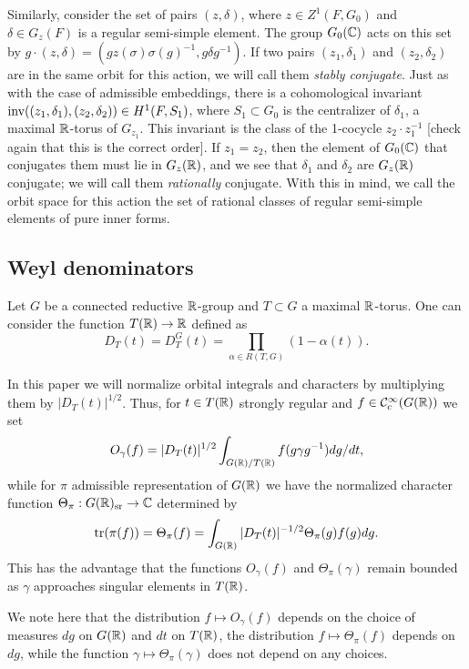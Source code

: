 \documentclass{article}
\theoremstyle{definition}
\numberwithin{equation}{section}
\renewcommand{\-}{\hyp{}}
\newcommand{\warn}[1]{{\leavevmode\color{red}[#1]}}
\begin{document}
Similarly, consider the set of pairs $(z,\delta)$, where $z \in Z^1(F,G_0)$ and $\delta \in G_z(F)$ is a regular semi-simple element. The group $G_0(\mathbb{C})$ acts on this set by $g\cdot (z,\delta)=(gz(\sigma)\sigma(g)^{-1},g\delta g^{-1})$. If two pairs $(z_1,\delta_1)$ and $(z_2,\delta_2)$ are in the same orbit for this action, we will call them \emph{stably conjugate}. Just as with the case of admissible embeddings, there is a cohomological invariant $\textrm{inv}((z_1,\delta_1),(z_2,\delta_2)) \in H^1(F,S_1)$, where $S_1 \subset G_0$ is the centralizer of $\delta_1$, a maximal $\mathbb{R}$-torus of $G_{z_1}$. This invariant is the class of the 1-cocycle $z_2 \cdot z_1^{-1}$ \warn{check again that this is the correct order}. If $z_1=z_2$, then the element of $G_0(\mathbb{C})$ that conjugates them must lie in $G_z(\mathbb{R})$, and we see that $\delta_1$ and $\delta_2$ are $G_z(\mathbb{R})$ conjugate; we will call them \emph{rationally} conjugate. With this in mind, we call the orbit space for this action the set of rational classes of regular semi-simple elements of pure inner forms. 

\subsection{Weyl denominators} \label{sub:weyldenom}

Let $G$ be a connected reductive $\mathbb{R}$-group and $T \subset G$ a maximal $\mathbb{R}$-torus. One can consider the function $T(\mathbb{R}) \to \mathbb{R}$ defined as
\[ D_T(t) = D_T^G(t) = \textstyle\prod\limits_{\alpha \in R(T,G)} (1-\alpha(t)). \]

In this paper we will normalize orbital integrals and characters by multiplying them by $|D_T(t)|^{1/2}$. Thus, for $t \in T(\mathbb{R})$ strongly regular and $f \in \mathcal{C}_c^\infty(G(\mathbb{R}))$ we set
\[ O_\gamma(f) = |D_T(t)|^{1/2}\int_{G(\mathbb{R})/T(\mathbb{R})} f(g\gamma g^{-1})dg/dt, \]
while for $\pi$ admissible representation of $G(\mathbb{R})$ we have the normalized character function $\Theta_\pi : G(\mathbb{R})_{\textrm{sr}} \to \mathbb{C}$ determined by
\[ \textrm{tr}(\pi(f)) = \Theta_\pi(f) = \int_{G(\mathbb{R})} |D_T(t)|^{-1/2}\Theta_\pi(g)f(g)dg. \]
This has the advantage that the functions $O_\gamma(f)$ and $\Theta_\pi(\gamma)$  remain bounded as $\gamma$ approaches singular elements in $T(\mathbb{R})$.

We note here that the distribution $f \mapsto O_\gamma(f)$ depends on the choice of measures $dg$ on $G(\mathbb{R})$ and $dt$ on $T(\mathbb{R})$, the distribution $f\mapsto \Theta_\pi(f)$ depends on $dg$, while the function $\gamma \mapsto \Theta_\pi(\gamma)$ does not depend on any choices.
\end{document}
